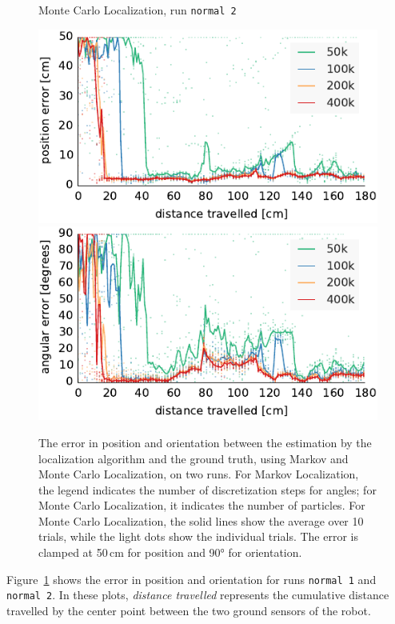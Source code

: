 \documentclass[letterpaper, 10pt, conference]{ieeeconf}
\newcommand{\Fig}[1]{Figure~\ref{fig:#1}}
\begin{document}
\begin{figure}
\begin{center}
Monte Carlo Localization, run \texttt{normal 2}
\end{center}
\includegraphics{mcl-whole_random_2-xy}\hfill
\includegraphics{mcl-whole_random_2-theta}

\caption{The error in position and orientation between the estimation by the localization algorithm and the ground truth, using Markov and Monte Carlo Localization, on two runs.
For Markov Localization, the legend indicates the number of discretization steps for angles; for Monte Carlo Localization, it indicates the number of particles.
For Monte Carlo Localization, the solid lines show the average over 10 trials, while the light dots show the individual trials.
The error is clamped at 50\,cm for position and 90° for orientation.}
\label{fig:whole-runs-random12}
\end{figure}

\Fig{whole-runs-random12} shows the error in position and orientation for runs \texttt{normal 1} and \texttt{normal 2}.
In these plots, \emph{distance travelled} represents the cumulative distance travelled by the center point between the two ground sensors of the robot.
\end{document}
